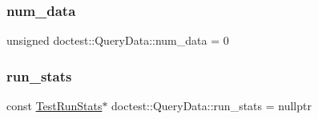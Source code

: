 \subsubsection{\texorpdfstring{num\+\_\+data}{num\_data}}
{\footnotesize\ttfamily unsigned doctest\+::\+Query\+Data\+::num\+\_\+data = 0}

\mbox{\label{structdoctest_1_1_query_data_a435f443f389323f47cb8b0e4202bbea9}} 
\subsubsection{\texorpdfstring{run\+\_\+stats}{run\_stats}}
{\footnotesize\ttfamily const \hyperlink{structdoctest_1_1_test_run_stats}{Test\+Run\+Stats}$\ast$ doctest\+::\+Query\+Data\+::run\+\_\+stats = nullptr}

